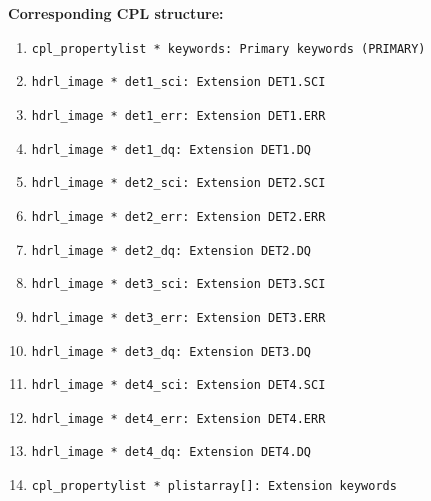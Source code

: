 \begin{datastructdef}
    \textbf{Corresponding \ac{CPL} structure:}
    \begin{enumerate}
            \item \texttt{cpl\_propertylist * keywords: Primary keywords (PRIMARY)}
            \item \texttt{hdrl\_image * det1\_sci: Extension DET1.SCI}
            \item \texttt{hdrl\_image * det1\_err: Extension DET1.ERR}
            \item \texttt{hdrl\_image * det1\_dq: Extension DET1.DQ}
            \item \texttt{hdrl\_image * det2\_sci: Extension DET2.SCI}
            \item \texttt{hdrl\_image * det2\_err: Extension DET2.ERR}
            \item \texttt{hdrl\_image * det2\_dq: Extension DET2.DQ}
            \item \texttt{hdrl\_image * det3\_sci: Extension DET3.SCI}
            \item \texttt{hdrl\_image * det3\_err: Extension DET3.ERR}
            \item \texttt{hdrl\_image * det3\_dq: Extension DET3.DQ}
            \item \texttt{hdrl\_image * det4\_sci: Extension DET4.SCI}
            \item \texttt{hdrl\_image * det4\_err: Extension DET4.ERR}
            \item \texttt{hdrl\_image * det4\_dq: Extension DET4.DQ}
            \item \texttt{cpl\_propertylist * plistarray[]: Extension keywords}
    \end{enumerate}
\end{datastructdef}

